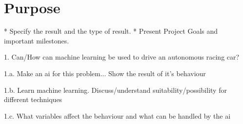 \chapter*{Purpose}
  * Specify the result and the type of result.
  * Present Project Goals and important milestones.
  
  1. Can/How can machine learning be used to drive an autonomous racing car?
  
    1.a. Make an ai for this problem...
         Show the result of it's behaviour
    
    1.b. Learn machine learning. Discuss/understand suitability/possibility for different techniques
    
    1.c. What variables affect the behaviour and what can be handled by the ai
  
  
  
  